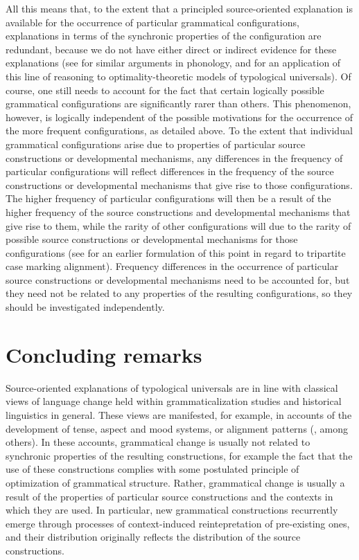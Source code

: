 \documentclass[output=paper]{langsci/langscibook}
\begin{document}
All this means that, to the extent that a principled source-oriented
explanation is available for the occurrence of particular grammatical
configurations, explanations in terms of the synchronic properties of
the configuration are redundant, because we do not have either direct
or indirect evidence for these explanations (see \citealt{Blevins2004} for
similar arguments in phonology, and \citealt{Newmeyer2002,Newmeyer2004} for an application of
this line of reasoning to optimality-theoretic models of typological
universals). Of course, one still needs to account for the fact that
certain logically possible grammatical configurations
are significantly rarer than others. This phenomenon, however, is logically
independent of the possible motivations for the occurrence of the more
frequent configurations, as
detailed above. To the extent that
individual grammatical configurations arise due to properties of
particular source constructions or developmental mechanisms, any differences in the frequency of particular
configurations will reflect differences in the frequency of
the source constructions or developmental mechanisms that give
rise to those configurations. The higher
frequency of particular configurations will then  be a result of the higher frequency of the  source
constructions and developmental mechanisms that give rise to them,
while the rarity of other configurations
will  due to the rarity of possible
source constructions or developmental mechanisms for those
configurations (see \citealt{Harris2008} for an earlier formulation of this point
in regard to tripartite case marking alignment). Frequency differences in the occurrence of particular source
constructions or developmental mechanisms need to be
accounted for, but they need not be related to any properties of the
resulting configurations, so they should be investigated independently.

\section{Concluding remarks}
Source-oriented explanations of typological universals are  in line with classical
views of language change held within
grammaticalization studies and historical linguistics in
general. These views are manifested, for example, in accounts of the
development of tense, aspect and mood systems, or alignment
patterns (\citealt{BybeeEtAl1994,HarrisCampbell1995,Gildea1998,TraugottDasher2002}, among others). In these accounts, grammatical change
is usually not related to synchronic properties of the resulting
constructions, for example the fact that the use of these
constructions complies with some postulated principle of optimization
of grammatical structure. Rather, grammatical change is usually a result of the properties of particular
source constructions and the contexts in which they are used. In
particular, new grammatical constructions recurrently emerge through
processes of context-induced reintepretation of pre-existing
ones, and their distribution originally reflects the distribution of the
source constructions. 
\end{document}
